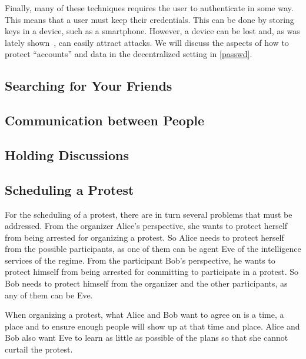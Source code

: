 Finally, many of these techniques requires the user to authenticate in some 
way.
This means that a user must keep their credentials.
This can be done by storing keys in a device, such as a smartphone.
However, a device can be lost and, as was lately shown~\cite{AppleVsFBI}, can 
easily attract attacks.
We will discuss the aspects of how to protect \enquote{accounts} and data in 
the decentralized setting in \cref{passwd}.

\subsection{Searching for Your Friends}
\label{UserSearch}





\subsection{Communication between People}
\label{Communicating}



\subsection{Holding Discussions}
\label{Discussions}



\subsection{Scheduling a Protest}
\label{Scheduling}

For the scheduling of a protest, there are in turn several problems that must 
be addressed.
From the organizer Alice's perspective, she wants to protect herself from being 
arrested for organizing a protest.
So Alice needs to protect herself from the possible participants, as one of 
them can be agent Eve of the intelligence services of the regime.
From the participant Bob's perspective, he wants to protect himself from being 
arrested for committing to participate in a protest.
So Bob needs to protect himself from the organizer and the other participants, 
as any of them can be Eve.

When organizing a protest, what Alice and Bob want to agree on is a time, 
a place and to ensure enough people will show up at that time and place.
Alice and Bob also want Eve to learn as little as possible of the plans so 
that she cannot curtail the protest.

